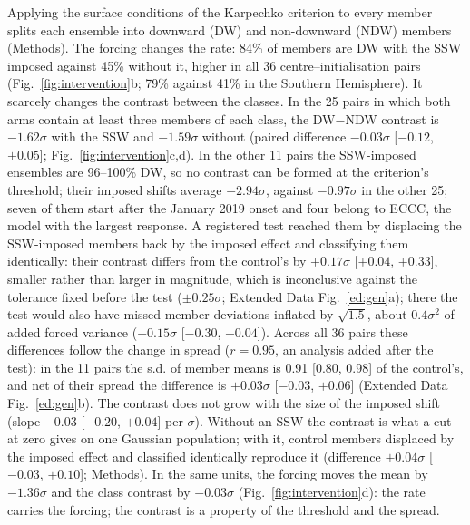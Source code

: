 \documentclass[11pt]{article}
\begin{document}
Applying the surface conditions of the Karpechko criterion to every member splits each ensemble into downward (DW) and non-downward (NDW) members (Methods). The forcing changes the rate: 84\% of members are DW with the SSW imposed against 45\% without it, higher in all 36 centre--initialisation pairs (Fig.~\ref{fig:intervention}b; 79\% against 41\% in the Southern Hemisphere). It scarcely changes the contrast between the classes. In the 25 pairs in which both arms contain at least three members of each class, the DW$-$NDW contrast is $-1.62\sigma$ with the SSW and $-1.59\sigma$ without (paired difference $-0.03\sigma$ [$-0.12$, $+0.05$]; Fig.~\ref{fig:intervention}c,d). In the other 11 pairs the SSW-imposed ensembles are 96--100\% DW, so no contrast can be formed at the criterion's threshold; their imposed shifts average $-2.94\sigma$, against $-0.97\sigma$ in the other 25; seven of them start after the January 2019 onset and four belong to ECCC, the model with the largest response. A registered test reached them by displacing the SSW-imposed members back by the imposed effect and classifying them identically: their contrast differs from the control's by $+0.17\sigma$ [$+0.04$, $+0.33$], smaller rather than larger in magnitude, which is inconclusive against the tolerance fixed before the test ($\pm0.25\sigma$; Extended Data Fig.~\ref{ed:gen}a); there the test would also have missed member deviations inflated by $\sqrt{1.5}$, about $0.4\sigma^2$ of added forced variance ($-0.15\sigma$ [$-0.30$, $+0.04$]). Across all 36 pairs these differences follow the change in spread ($r = 0.95$, an analysis added after the test): in the 11 pairs the s.d. of member means is 0.91 [0.80, 0.98] of the control's, and net of their spread the difference is $+0.03\sigma$ [$-0.03$, $+0.06$] (Extended Data Fig.~\ref{ed:gen}b). The contrast does not grow with the size of the imposed shift (slope $-0.03$ [$-0.20$, $+0.04$] per $\sigma$). Without an SSW the contrast is what a cut at zero gives on one Gaussian population; with it, control members displaced by the imposed effect and classified identically reproduce it (difference $+0.04\sigma$ [$-0.03$, $+0.10$]; Methods). In the same units, the forcing moves the mean by $-1.36\sigma$ and the class contrast by $-0.03\sigma$ (Fig.~\ref{fig:intervention}d): the rate carries the forcing; the contrast is a property of the threshold and the spread.
\end{document}
